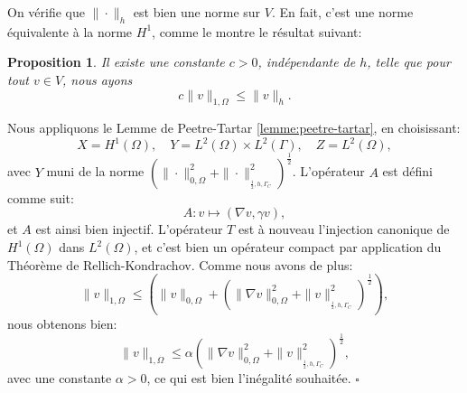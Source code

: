 \documentclass[11pt]{book}
\newtheorem{proposition}[theorem]{Proposition}
\newcommand{\bp}{\begin{proposition}}
\newcommand{\ep}{\end{proposition}}
\newcommand{\cqfd}{{$\mbox{}$\hfill$\square$}}
\def\n{{\bf n}}
\newcommand{\R}{\mathbb{R}}
\newcommand{\Gc}{\Gamma_{C}}
\newcommand{\dnu}{\partial_{\n} u}
\newcommand{\npgc}[1]{\|{#1}\|_{_{\frac12,h,\Gc}}}
\begin{document}
On vérifie que $\| \cdot \|_h$ est bien une norme sur $V$. En fait, c'est une norme équivalente à la norme $H^1$, comme le montre le résultat suivant:

\bp \label{prop:normh} Il existe une constante $c>0$, indépendante de $h$, telle que pour tout $v \in V$, nous ayons
\[
 c \| v \|_{1,\Omega} \leq \| v \|_h.
\]
\ep

\proof Nous appliquons le Lemme de Peetre-Tartar \ref{lemme:peetre-tartar}, en choisissant:
\[
 X = H^1(\Omega), \quad Y = L^2(\Omega) \times L^2(\Gamma), \quad Z = L^2(\Omega),
\]
avec $Y$ muni de la norme $( \| \cdot \|^2_{0,\Omega} + \npgc{\cdot}^2 )^{\frac12}$.
L'opérateur $A$ est défini comme suit:
\[
 A : v \mapsto ( \nabla v , \gamma v ),
\]
et $A$ est ainsi bien injectif. L'opérateur $T$ est à nouveau l'injection canonique de $H^1(\Omega)$ dans $L^2(\Omega)$, et c'est bien un opérateur compact par application du Théorème de Rellich-Kondrachov.
Comme nous avons de plus:
\[
 \| v \|_{1,\Omega} \leq \left ( \| v \|_{0,\Omega} + ( \| \nabla v \|^2_{0,\Omega} + \npgc{v}^2 )^{\frac12}
 \right ),
\]
nous obtenons bien:
\[
 \| v \|_{1,\Omega} \leq \alpha \left ( \| \nabla v \|^2_{0,\Omega} + \npgc{v}^2  \right )^{\frac12},
\]
avec une constante $\alpha > 0$, ce qui est bien l'inégalité souhaitée.
\cqfd

\end{document}
